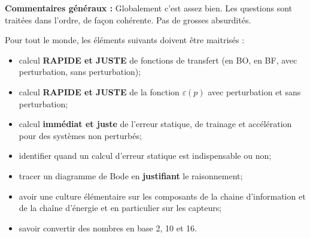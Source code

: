 \documentclass[10pt,fleqn]{article} %
\begin{document}

\pagestyle{fancy}
\thispagestyle{plain}


\def\columnseprulecolor{\color{ocre}}
\setlength{\columnseprule}{0.4pt} 



\vspace{6cm}


\textbf{Commentaires généraux : }
Globalement c'est assez bien. Les questions sont traitées dans l'ordre, de façon cohérente. Pas de grosses absurdités.



Pour tout le monde, les éléments suivants doivent être maitrisés : 
\begin{itemize}
\item calcul \textbf{RAPIDE et JUSTE} de fonctions de transfert (en BO, en BF, avec perturbation, sans perturbation);
\item calcul \textbf{RAPIDE et JUSTE} de la fonction $\varepsilon(p)$ avec perturbation et sans perturbation;
\item calcul \textbf{immédiat et juste} de l'erreur statique, de trainage et accélération pour des systèmes non perturbés;
\item identifier quand un calcul d'erreur statique est indispensable ou non;
\item tracer un diagramme de Bode en \textbf{justifiant} le raisonnement;
\item avoir une culture élémentaire sur les composants de la chaine d'information et de la chaîne d'énergie et en particulier sur les capteurs;
\item savoir convertir des nombres en base 2, 10 et 16. 
\end{itemize}
\end{document}
